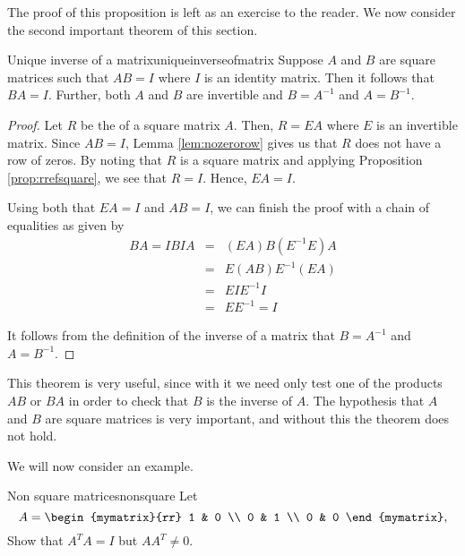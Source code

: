 The proof of this proposition is left as an exercise to the reader. 
We now consider the second important theorem of this section. 

\begin{theorem}{Unique inverse of a matrix}{uniqueinverseofmatrix}
Suppose $A$ and $B$ are square matrices such that $AB=I$ where $I$ is an identity matrix. Then it follows that $BA=I$. Further, both $A$ and $B$ are invertible and $B=A^{-1}$ and $A=B^{-1}$.
\end{theorem}

\begin{proof}
Let $R$ be the {\rref} of a square matrix $A$. Then, $R=EA$ where $E$ is an invertible matrix. Since $AB=I$, Lemma \ref{lem:nozerorow} gives us that $R$ does not have a row of zeros. By noting that $R$ is a square matrix and applying Proposition \ref{prop:rrefsquare}, we see that $R=I$. Hence, $EA=I$. 

Using both that $EA=I$ and $AB=I$, we can finish the proof with a chain of equalities as given by
\begin{eqnarray*}
BA = IBIA &=& (EA)B(E^{-1}E)A \\
&=& E(AB)E^{-1}(EA) \\
&=& EIE^{-1}I \\
&=& EE^{-1} = I
\end{eqnarray*}

It follows from the definition of the inverse of a matrix that $B=A^{-1}$ and $A=B^{-1}$.
\end{proof}

This theorem is very useful, since with it we need only test one of the products $AB$ or $BA$ in order to check that $B$ is the inverse of $A$. The hypothesis that $A$ and $B$ are square matrices is very important, and without this the theorem does not hold.

We will now consider an example.

\begin{example}{Non square matrices}{nonsquare}
Let 
\begin{equation*}
A =
\begin{mymatrix}{rr}
1 & 0 \\
0 & 1 \\
0 & 0 
\end{mymatrix},
\end{equation*}
Show that $A^{T}A = I$ but $AA^{T} \neq 0$. 
\end{example}

